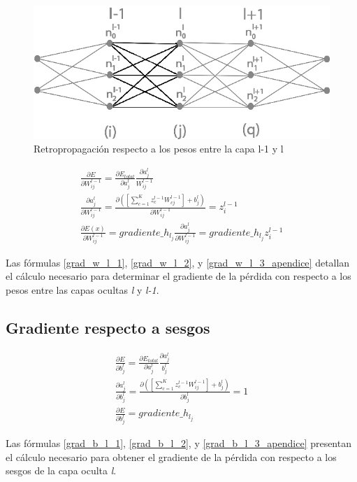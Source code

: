 \begin{figure}[H]
	\centering
	\includegraphics[scale=0.35]{imagenes/conclusion_pesos.jpg}  
	\caption{Retropropagación respecto a los pesos entre la capa l-1 y l}
	\label{fig:conclusion_pesos_apendice}
\end{figure}

\begin{gather}
	\frac{\partial E}{\partial W^{l-1}_{ij}} = \frac{\partial E_{total} }{\partial a^l_j }   \frac{\partial a^l_j}{W^{l-1}_{ij}} \label{grad_w_l_1} \\
	\frac{\partial a^l_j }{\partial W^{l-1}_{ij} } = \frac{\partial ([\sum_{c=1}^{K} z^{l-1}_c   W^{l-1}_{cj}] + b^l_j)}{\partial W^{l-1}_{ij} } = z^{l-1}_i \label{grad_w_l_2} \\
	\frac{\partial E(x) }{\partial W^{l-1}_{ij} } = gradiente\_h_{l_j}   \frac{\partial a^l_j }{\partial W^{l-1}_{ij} } = gradiente\_h_{l_j}   z^{l-1}_i \label{grad_w_l_3_apendice}
\end{gather}

Las fórmulas \ref{grad_w_l_1}, \ref{grad_w_l_2}, y \ref{grad_w_l_3_apendice} detallan el cálculo necesario para determinar el gradiente de la pérdida con respecto a los pesos entre las capas ocultas \textit{l} y \textit{l-1}.

\subsection{Gradiente respecto a sesgos}

\begin{gather}
	\frac{\partial E}{\partial b^l_j} = \frac{\partial E_{total} }{\partial a^l_j }   \frac{\partial a^l_j}{b^l_j} \label{grad_b_l_1} \\
	\frac{\partial a^l_j }{\partial b^l_j } = \frac{\partial ([\sum_{c=1}^{K} z^{l-1}_c   W^{l-1}_{ij}] + b^l_j) }{\partial b^l_j } = 1 \label{grad_b_l_2} \\
	\frac{\partial E}{\partial b^l_j} = gradiente\_h_{l_j} \label{grad_b_l_3_apendice}
\end{gather}

Las fórmulas \ref{grad_b_l_1}, \ref{grad_b_l_2}, y \ref{grad_b_l_3_apendice} presentan el cálculo necesario para obtener el gradiente de la pérdida con respecto a los sesgos de la capa oculta \textit{l}.
